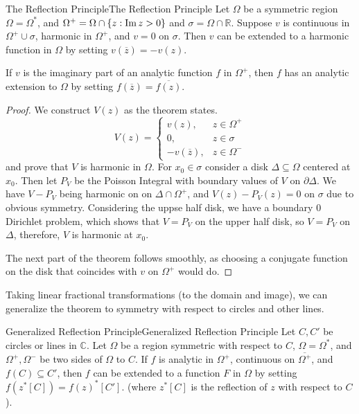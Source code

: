 \documentclass[../main.tex]{subfiles}
\begin{document}
\begin{theorem}{The Reflection Principle}{The Reflection Principle}
	Let $\Omega$ be a symmetric region $\Omega=\Omega^*$, and $\Omega^+ = \Omega \cap \left\{ z: \operatorname{Im} z>0 \right\}$ and $\sigma= \Omega\cap \mathbb{R}$. Suppose $v$ is continuous in $\Omega^+\cup \sigma$, harmonic in $\Omega^+$, and $v=0$ on $\sigma$. Then $v$ can be extended to a harmonic function in $\Omega$ by setting $v(\overline{z}) = -v(z)$.

	If $v$ is the imaginary part of an analytic function $f$ in $\Omega^+$, then $f$ has an analytic extension to $\Omega$ by setting $f(\overline{z}) = \overline{f(z)}$.
\end{theorem}
\begin{proof}
We construct $V(z)$ as the theorem states.
\begin{equation*}
	V(z) = 
	\begin{cases}
		v(z), & z\in \Omega^+\\
		0, & z\in \sigma\\
		-v(\overline{z}), & z\in \Omega^-
	\end{cases}
\end{equation*}
and prove that $V$ is harmonic in $\Omega$. For $x_0\in \sigma$ consider a disk $\Delta \subseteq \Omega$ centered at $x_0$. Then let $P_V$ be the Poisson Integral with boundary values of $V$ on $\partial \Delta$. We have $V- P_V$ being harmonic on on $\Delta\cap \Omega^+$, and $V(z)-P_V(z)=0$ on $\sigma$ due to obvious symmetry. Considering the uppse half disk, we have a boundary $0$ Dirichlet problem, which shows that $V=P_V$ on the upper half disk, so $V=P_V$ on $\Delta$, therefore, $V$ is harmonic at $x_0$.

The next part of the theorem follows smoothly, as choosing a conjugate function on the disk that coincides with $v$ on $\Omega^+$ would do.
\end{proof}

Taking linear fractional transformations (to the domain and image), we can generalize the theorem to symmetry with respect to circles and other lines.

\begin{theorem}{Generalized Reflection Principle}{Generalized Reflection Principle}
	Let $C,C'$ be circles or lines in $\mathbb{C}$. Let $\Omega$ be a region symmetric with respect to $C$, $\Omega=\Omega^*$, and $\Omega^+, \Omega^-$ be two sides of $\Omega$ to $C$. If $f$ is analytic in $\Omega^+$, continuous on $\overline{\Omega^+}$, and $f(C) \subseteq C'$, then $f$ can be extended to a function $F$ in $\Omega$ by setting $f(z^*[C]) = f(z)^*[C']$. (where $z^*[C]$ is the reflection of $z$ with respect to $C$).
\end{theorem}
\end{document}

